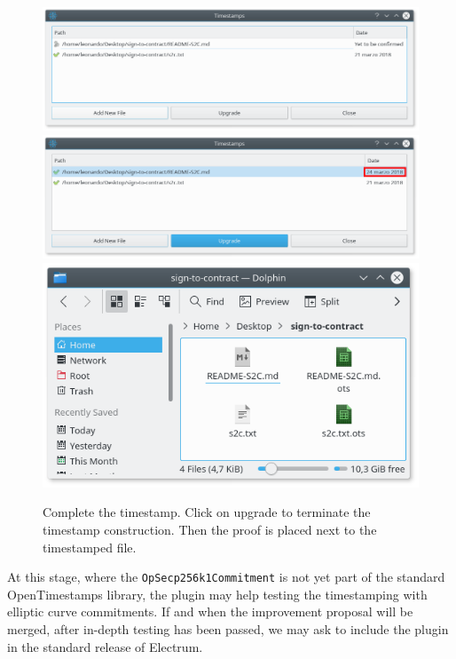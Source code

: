 \begin{figure}
	\begin{center}
		\includegraphics[width=\linewidth]{Images/pending-attestation.png}
		\includegraphics[width=\linewidth]{Images/post-upgrade.png}
		\includegraphics[width=0.7\linewidth]{Images/file-and-ots.png}
		\caption[Complete the timestamp.]{Complete the timestamp. Click on upgrade to terminate the timestamp construction. Then the proof is placed next to the timestamped file.}
		\label{fig:upgrade}
	\end{center}
\end{figure} 


At this stage, where  the \verb|OpSecp256k1Commitment| is not yet part of the standard OpenTimestamps library, the plugin may help testing the timestamping with elliptic curve commitments. 
If and when the improvement proposal will be merged, after in-depth testing has been passed, we may ask to include the plugin in the standard release of Electrum.